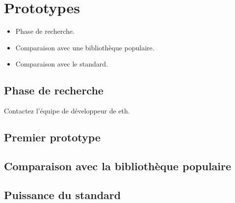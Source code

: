 \section{Prototypes}

\begin{itemize}
    \item Phase de recherche.
    \item Comparaison avec une bibliothèque populaire.
    \item Comparaison avec le standard.
\end{itemize}

\subsection{Phase de recherche}

Contactez l'équipe de développeur de eth.

\subsection{Premier prototype}

\subsection{Comparaison avec la bibliothèque populaire}

\subsection{Puissance du standard}


